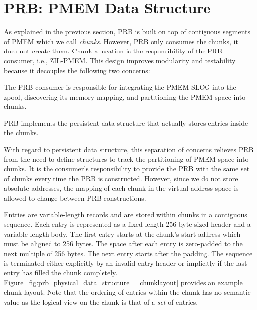 \documentclass[12pt,a4paper,twoside]{book}
\begin{document}
\section{PRB: PMEM Data Structure}\label{di:prb:pmemdatastructure}
As explained in the previous section, PRB is built on top of contiguous segments of PMEM which we call \textit{chunks}.
However, PRB only consumes the chunks, it does not create them.
Chunk allocation is the responsibility of the PRB consumer, i.e., ZIL-PMEM.
This design improves modularity and testability because it decouples the following two concerns:
\begin{description}[noitemsep,leftmargin=1.5cm,labelindent=1cm]
    \item[Resource Acquisition] The PRB consumer is responsible for integrating the PMEM SLOG into the zpool, discovering its memory mapping, and partitioning the PMEM space into chunks.
    \item[PMEM Data Structure] PRB implements the persistent data structure that actually stores entries inside the chunks.
\end{description}
With regard to persistent data structure, this separation of concerns relieves PRB from the need to define structures to track the partitioning of PMEM space into chunks.
It is the consumer's responsibility to provide the PRB with the same set of chunks every time the PRB is constructed.
However, since we do not store absolute addresses, the mapping of each chunk in the virtual address space is allowed to change between PRB constructions.


Entries are variable-length records and are stored within chunks in a contiguous sequence.
Each entry is represented as a fixed-length 256 byte sized header and a variable-length body.
The first entry starts at the chunk's start address which must be aligned to 256 bytes.
The space after each entry is zero-padded to the next multiple of 256 bytes.
The next entry starts after the padding.
The sequence is terminated either explicitly by an invalid entry header or implicitly if the last entry has filled the chunk completely.
Figure~\ref{fig:prb_physical_data_structure__chunklayout} provides an example chunk layout.
Note that the ordering of entries within the chunk has no semantic value as the logical view on the chunk is that of a \textit{set} of entries.
\end{document}
